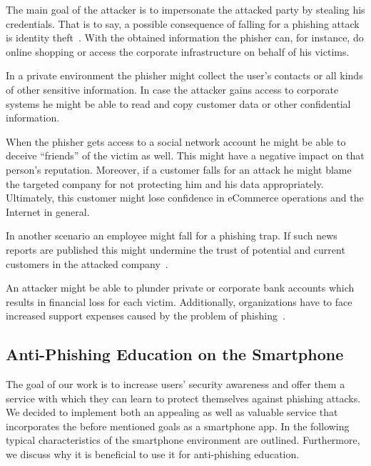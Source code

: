 \begin{description}[leftmargin=0cm]
\item[Identity Theft:] The main goal of the attacker is to impersonate the attacked party by stealing his credentials. That is to say, a possible consequence of falling for a phishing attack is identity theft~\cite{jakobsson2006phishing}. With the obtained information the phisher can, for instance, do online shopping or access the corporate infrastructure on behalf of his victims.
\item[Data Theft:]
In a private environment the phisher might collect the user's contacts or all kinds of other sensitive information.
In case the attacker gains access to corporate systems he might be able to read and copy customer data or other confidential information.
\item[Reputational Damage:]
When the phisher gets access to a social network account he might be able to deceive ``friends'' of the victim as well. This might have a negative impact on that person's reputation.
Moreover, if a customer falls for an attack he might blame the targeted company for not protecting him and his data appropriately. 
Ultimately, this customer might lose confidence in eCommerce operations and the Internet in general.

In another scenario an employee might fall for a phishing trap.
If such news reports are published this might undermine the trust of potential and current customers in the attacked company~\cite{mcafee, redcondor}. 
\item[Financial Loss:]
An attacker might be able to plunder private or corporate bank accounts which results in financial loss for each victim. Additionally, organizations have to face increased support expenses caused by the problem of phishing~\cite{rsa2013, mcafee}.
\end{description}

\subsection{Anti-Phishing Education on the Smartphone}
\label{s:antiphishing_on_smartphone}
The goal of our work is to increase users' security awareness and offer them a service with which they can learn to protect themselves against phishing attacks.
We decided to implement both an appealing as well as valuable service that incorporates the before mentioned goals as a smartphone app.
In the following typical characteristics of the smartphone environment are outlined. Furthermore, we discuss why it is beneficial to use it for anti-phishing education.


